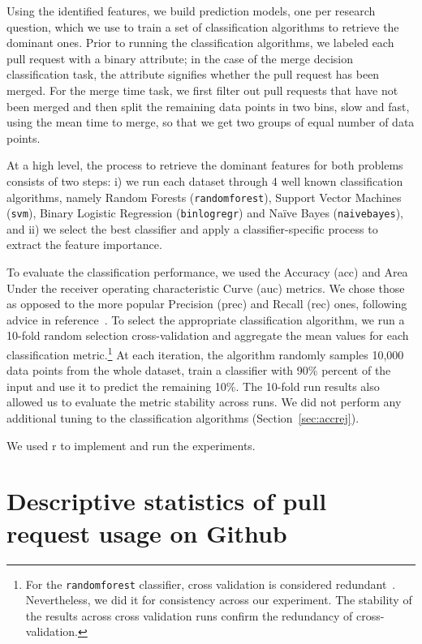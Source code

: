 \documentclass{acm_proc_article-sp}
\begin{document}
Using the identified features, we build prediction models, one per research
question, which we use to train a set of classification algorithms to retrieve
the dominant ones. Prior to running the classification algorithms, we labeled
each pull request with a binary attribute; in the case of the \textsf{merge
decision} classification task, the attribute signifies whether the pull request
has been merged. For the \textsf{merge time} task, we first filter out pull
requests that have not been merged and then split the remaining data points in
two bins, slow and fast, using the mean time to merge, so that we get two
groups of equal number of data points.

At a high level, the process to retrieve the dominant features for both
problems consists of two steps: i) we run each dataset through 4 well known
classification algorithms, namely Random Forests (\texttt{randomforest}),
Support Vector Machines (\texttt{svm}), Binary Logistic Regression
(\texttt{binlogregr}) and Na\"ive Bayes (\texttt{naivebayes}), and ii) we select
the best classifier and apply a classifier-specific process to extract the
feature importance. 

To evaluate the classification performance, we used the Accuracy ({\sc acc}) and
Area Under the receiver operating characteristic Curve ({\sc auc}) metrics. We
chose those as opposed to the more popular Precision ({\sc prec}) and Recall
({\sc rec}) ones, following advice in reference~\cite{Lessm08}. To select the
appropriate classification algorithm, we run a 10-fold random selection
cross-validation and aggregate the mean values for each classification
metric.\footnote{For the \texttt{randomforest} classifier, cross validation is
considered redundant~\cite{Breim01}. Nevertheless, we did it for consistency
across our experiment. The stability of the results across cross validation runs
confirm the redundancy of cross-validation.} At each iteration, the algorithm
randomly samples 10,000 data points from the whole dataset, train a
classifier with 90\% percent of the input and use it to predict the remaining
10\%. The 10-fold run results also allowed us to evaluate the metric stability
across runs. We did not perform any additional tuning to the classification
algorithms (Section~\ref{sec:accrej}).

We used {\sc r} to implement and run the experiments.

\section{Descriptive statistics of pull request usage on Github}
\label{sec:github}
\end{document}
